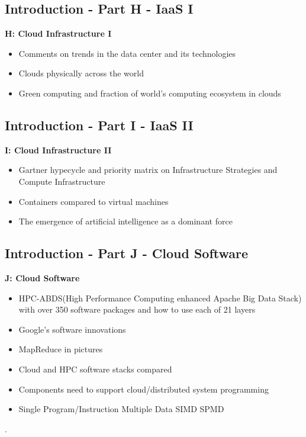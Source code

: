 \subsection{Introduction - Part H - IaaS I}\label{s:cloud-fundamentals-h}


\textbf{H: Cloud Infrastructure I}
\begin{itemize}
\item Comments on trends in the data center and its technologies
\item Clouds physically across the world
\item Green computing and fraction of world’s computing ecosystem in
  clouds
\end{itemize}

\subsection{Introduction - Part I - IaaS II}\label{s:cloud-fundamentals-i}

\textbf{I: Cloud Infrastructure II}
\begin{itemize}
\item Gartner hypecycle and priority matrix on Infrastructure
  Strategies and Compute Infrastructure
\item Containers compared to virtual machines
\item The emergence of artificial intelligence as a dominant force
\end{itemize}

\subsection{Introduction - Part J - Cloud Software}\label{s:cloud-fundamentals-j}


\textbf{J: Cloud Software}
\begin{itemize}
\item HPC-ABDS(High Performance Computing enhanced Apache Big Data
  Stack) with over 350 software packages and how to use each of 21
  layers
\item Google’s software innovations
\item MapReduce in pictures
\item Cloud and HPC software stacks compared
\item Components need to support cloud/distributed system programming
\item Single Program/Instruction Multiple Data SIMD SPMD
\end{itemize}.

